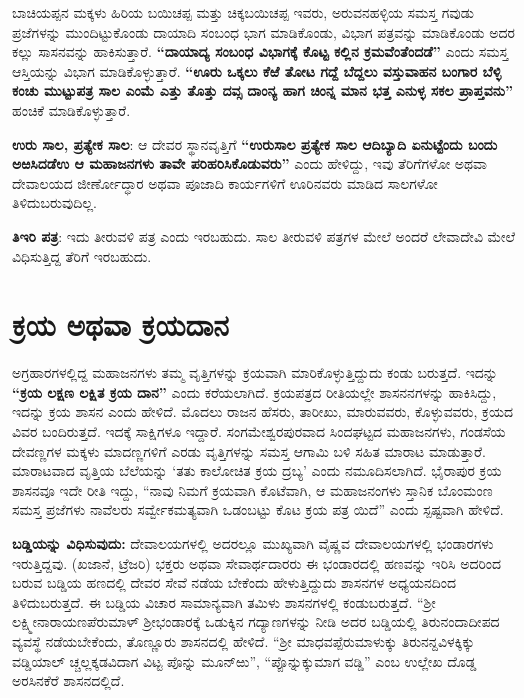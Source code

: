 ಬಾಚಿಯಪ್ಪನ ಮಕ್ಕಳು ಹಿರಿಯ ಬಯಿಚಪ್ಪ ಮತ್ತು ಚಿಕ್ಕಬಯಿಚಪ್ಪ ಇವರು, ಅರುವನಹಳ್ಳಿಯ ಸಮಸ್ತ ಗವುಡು ಪ್ರಜೆಗಳನ್ನು ಮುಂದಿಟ್ಟುಕೊಂಡು ದಾಯಾದಿ ಸಂಬಂಧ ಭಾಗ ಮಾಡಿಕೊಂಡು, ವಿಭಾಗ ಪತ್ರವನ್ನು ಮಾಡಿಕೊಂಡು ಅದರ ಕಲ್ಲು ಸಾಸನವನ್ನು ಹಾಕಿಸುತ್ತಾರೆ. \textbf{“ದಾಯಾದ್ಯ ಸಂಬಂಧ ವಿಭಾಗಕ್ಕೆ ಕೊಟ್ಟ ಕಲ್ಲಿನ ಕ್ರಮವೆಂತೆಂದಡೆ”} ಎಂದು ಸಮಸ್ತ ಆಸ್ತಿಯನ್ನು ವಿಭಾಗ ಮಾಡಿಕೊಳ್ಳುತ್ತಾರೆ. \textbf{“ಊರು ಒಕ್ಕಲು ಕೆಱೆ ತೋಟ ಗದ್ದೆ ಬೆದ್ದಲು ವಸ್ತುವಾಹನ ಬಂಗಾರ ಬೆಳ್ಳಿ ಕಂಚು ಮುಟ್ಟುಪತ್ರ ಸಾಲ ಎಂಮೆ ಎತ್ತು ತೊತ್ತು ದವ್ಸ ದಾಂನ್ಯ ಹಾಗ ಚಿಂನ್ನ ಮಾನ ಭತ್ತ ಎನುಳ್ಳ ಸಕಲ ಪ್ರಾಪ್ತವನು”} ಹಂಚಿಕೆ ಮಾಡಿಕೊಳ್ಳುತ್ತಾರೆ.

\textbf{ಉರು ಸಾಲ, ಪ್ರತ್ಯೇಕ ಸಾಲ}: ಆ ದೇವರ ಸ್ಥಾನವೃತ್ತಿಗೆ \textbf{“ಉರುಸಾಲ ಪ್ರತ್ಯೇಕ ಸಾಲ ಆದಿಬ್ಯಾದಿ ಏನುಟ್ಟೆಂದು ಬಂದು ಅಱಸಿದಡೆಉ ಆ ಮಹಾಜನಗಳು ತಾವೇ ಪರಿಹರಿಸಿಕೊಡುವರು” }ಎಂದು ಹೇಳಿದ್ದು, ಇವು ತೆರಿಗೆಗಳೋ ಅಥವಾ ದೇವಾಲಯದ ಜೀರ್ಣೋದ್ಧಾರ ಅಥವಾ ಪೂಜಾದಿ ಕಾರ್ಯಗಳಿಗೆ ಊರಿನವರು ಮಾಡಿದ ಸಾಲಗಳೋ ತಿಳಿದುಬರುವುದಿಲ್ಲ.

\textbf{ತಿಇರಿ ಪತ್ರ}: ಇದು ತೀರುವಳಿ ಪತ್ರ ಎಂದು ಇರಬಹುದು. ಸಾಲ ತೀರುವಳಿ ಪತ್ರಗಳ ಮೇಲೆ ಅಂದರೆ ಲೇವಾದೇವಿ ಮೇಲೆ ವಿಧಿಸುತ್ತಿದ್ದ ತೆರಿಗೆ ಇರಬಹುದು.

\section{ಕ್ರಯ ಅಥವಾ ಕ್ರಯದಾನ}

ಅಗ್ರಹಾರಗಳಲ್ಲಿದ್ದ ಮಹಾಜನಗಳು ತಮ್ಮ ವೃತ್ತಿಗಳನ್ನು ಕ್ರಯವಾಗಿ ಮಾರಿಕೊಳ್ಳುತ್ತಿದ್ದುದು ಕಂಡು ಬರುತ್ತದೆ. ಇದನ್ನು\textbf{ “ಕ್ರಯ ಲಕ್ಷಣ ಲಕ್ಷಿತ ಕ್ರಯ ದಾನ” } ಎಂದು ಕರೆಯಲಾಗಿದೆ. ಕ್ರಯಪತ್ರದ ರೀತಿಯಲ್ಲೇ ಶಾಸನನಗಳನ್ನು ಹಾಕಿಸಿದ್ದು, ಇದನ್ನು ಕ್ರಯ ಶಾಸನ ಎಂದು ಹೇಳಿದೆ. ಮೊದಲು ರಾಜನ ಹೆಸರು, ತಾರೀಖು, ಮಾರುವವರು, ಕೊಳ್ಳುವವರು, ಕ್ರಯದ ವಿವರ ಬಂದಿರುತ್ತದೆ. ಇದಕ್ಕೆ ಸಾಕ್ಷಿಗಳೂ ಇದ್ದಾರೆ. ಸಂಗಮೇಶ್ವರಪುರವಾದ ಸಿಂದಘಟ್ಟದ ಮಹಾಜನಗಳು, ಗಂಡಸೆಯ ದೇವಣ್ಣಗಳ ಮಕ್ಕಳು ಮಾದಣ್ಣಗಳಿಗೆ ಎರಡು ವೃತ್ತಿಗಳನ್ನು ಸಮಸ್ತ ಆಗಾಮಿ ಬಳಿ ಸಹಿತ ಮಾರಾಟ ಮಾಡುತ್ತಾರೆ. ಮಾರಾಟವಾದ ವೃತ್ತಿಯ ಬೆಲೆಯನ್ನು ‘ತತು ಕಾಲೋಚಿತ ಕ್ರಯ ದ್ರಬ್ಯ’ ಎಂದು ನಮೂದಿಸಲಾಗಿದೆ. ಭೈರಾಪುರ ಕ್ರಯ ಶಾಸನವೂ ಇದೇ ರೀತಿ ಇದ್ದು, “ನಾವು ನಿಮಗೆ ಕ್ರಯವಾಗಿ ಕೊಟೆವಾಗಿ, ಆ ಮಹಾಜನಂಗಳು ಸ್ತಾನಿಕ ಬೊಂಮಂಣ ಸಮಸ್ತ ಪ್ರಜೆಗಳು ನಾವೆಲರು ಸರ್ವ್ವೇಕಮತ್ಯವಾಗಿ ಒಡಂಬಟ್ಟು ಕೊಟ ಕ್ರಯ ಪತ್ರ ಯಿದೆ” ಎಂದು ಸ್ಪಷ್ಟವಾಗಿ ಹೇಳಿದೆ.

\textbf{ಬಡ್ಡಿಯನ್ನು ವಿಧಿಸುವುದು:} ದೇವಾಲಯಗಳಲ್ಲಿ ಅದರಲ್ಲೂ ಮುಖ್ಯವಾಗಿ ವೈಷ್ಣವ ದೇವಾಲಯಗಳಲ್ಲಿ ಭಂಡಾರಗಳು ಇರುತ್ತಿದ್ದವು. (ಖಜಾನೆ, ಟ್ರೆಜರಿ) ಭಕ್ತರು ಅಥವಾ ಸೇವಾರ್ಥದಾರರು ಈ ಭಂಡಾರದಲ್ಲಿ ಹಣವನ್ನು ಇರಿಸಿ ಅದರಿಂದ ಬರುವ ಬಡ್ಡಿಯ ಹಣದಲ್ಲಿ ದೇವರ ಸೇವೆ ನಡೆಯ ಬೇಕೆಂದು ಹೇಳುತ್ತಿದ್ದುದು ಶಾಸನಗಳ ಅಧ್ಯಯನದಿಂದ ತಿಳಿದುಬರುತ್ತದೆ. ಈ ಬಡ್ಡಿಯ ವಿಚಾರ ಸಾಮಾನ್ಯವಾಗಿ ತಮಿಳು ಶಾಸನಗಳಲ್ಲಿ ಕಂಡುಬರುತ್ತದೆ. “ಶ‍್ರೀ ಲಕ್ಷ್ಮೀನಾರಾಯಣಪೆರುಮಾಳ್​ ಶ‍್ರೀಭಂಡಾರಕ್ಕೆ ಒಡುಕ್ಕಿನ ಗದ್ಯಾಣಗಳನ್ನು ನೀಡಿ ಅದರ ಬಡ್ಡಿಯಲ್ಲಿ ತಿರುನಂದಾದೀಪದ ವ್ಯವಸ್ಥೆ ನಡೆಯಬೇಕೆಂದು, ತೊಣ್ಣೂರು ಶಾಸನದಲ್ಲಿ ಹೇಳಿದೆ. “ಶ‍್ರೀ ಮಾಧವಪ್ಪೆರುಮಾಳುಕ್ಕು ತಿರುನನ್ದವಿಳಕ್ಕಿಕ್ಕು ವಡ್ಡಿಯಾಲ್​ ಚ್ಚಲ್ಲಕ್ಕಡವಿದಾಗ ವಿಟ್ಟ ಪೊನ್ನು ಮೂನ್​ಱು”, “ಪ್ಪೊನ್ನುಕ್ಕುಮಾಗ ವಡ್ಡಿ” ಎಂಬ ಉಲ್ಲೇಖ ದೊಡ್ಡ ಅರಸಿನಕೆರೆ ಶಾಸನದಲ್ಲಿದೆ.

